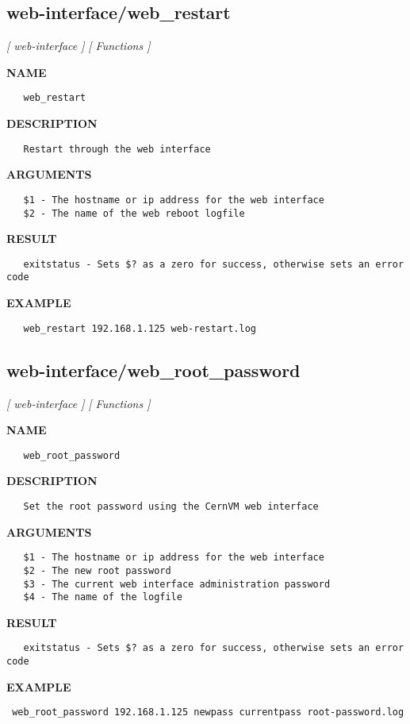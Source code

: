 \subsection{web-interface/web\_restart}
\textsl{[ web-interface ]}
\textsl{[ Functions ]}

\label{ch:robo69}
\label{ch:web_interface_web_restart}
\textbf{NAME}
\begin{verbatim}
   web_restart
\end{verbatim}
\textbf{DESCRIPTION}
\begin{verbatim}
   Restart through the web interface
\end{verbatim}
\textbf{ARGUMENTS}
\begin{verbatim}
   $1 - The hostname or ip address for the web interface
   $2 - The name of the web reboot logfile
\end{verbatim}
\textbf{RESULT}
\begin{verbatim}
   exitstatus - Sets $? as a zero for success, otherwise sets an error code
\end{verbatim}
\textbf{EXAMPLE}
\begin{verbatim}
   web_restart 192.168.1.125 web-restart.log
\end{verbatim}
\newpage
\subsection{web-interface/web\_root\_password}
\textsl{[ web-interface ]}
\textsl{[ Functions ]}

\label{ch:robo70}
\label{ch:web_interface_web_root_password}
\textbf{NAME}
\begin{verbatim}
   web_root_password
\end{verbatim}
\textbf{DESCRIPTION}
\begin{verbatim}
   Set the root password using the CernVM web interface
\end{verbatim}
\textbf{ARGUMENTS}
\begin{verbatim}
   $1 - The hostname or ip address for the web interface
   $2 - The new root password
   $3 - The current web interface administration password
   $4 - The name of the logfile
\end{verbatim}
\textbf{RESULT}
\begin{verbatim}
   exitstatus - Sets $? as a zero for success, otherwise sets an error code
\end{verbatim}
\textbf{EXAMPLE}
\begin{verbatim}
 web_root_password 192.168.1.125 newpass currentpass root-password.log
\end{verbatim}

